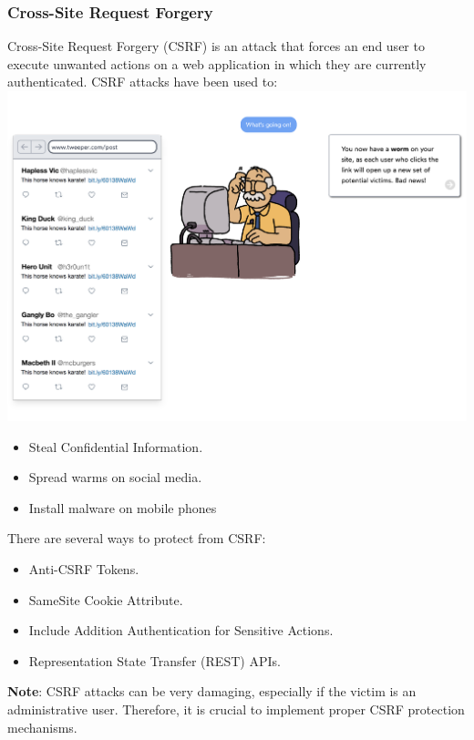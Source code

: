 \documentclass[12pt]{article}
\newcommand{\note}[1]{\textbf{#1}} %
\begin{document}
\newpage

\subsubsection{Cross-Site Request Forgery}
Cross-Site Request Forgery (CSRF) is an attack that forces an end user to execute unwanted actions on a web application in which they are currently authenticated. CSRF attacks have been used to: \\
\includegraphics[width=.7\textwidth]{Image16.png}
\begin{itemize}
    \item Steal Confidential Information.
    \item Spread warms on social media.
    \item Install malware on mobile phones
\end{itemize}
There are several ways to protect from CSRF:

\begin{itemize}
    \item Anti-CSRF Tokens.
    \item SameSite Cookie Attribute.
    \item Include Addition Authentication for Sensitive Actions.
    \item Representation State Transfer (REST) APIs.
\end{itemize}
\note{Note}: CSRF attacks can be very damaging, especially if the victim is an administrative user. Therefore, it is crucial to implement proper CSRF protection mechanisms.

\newpage
\end{document}
